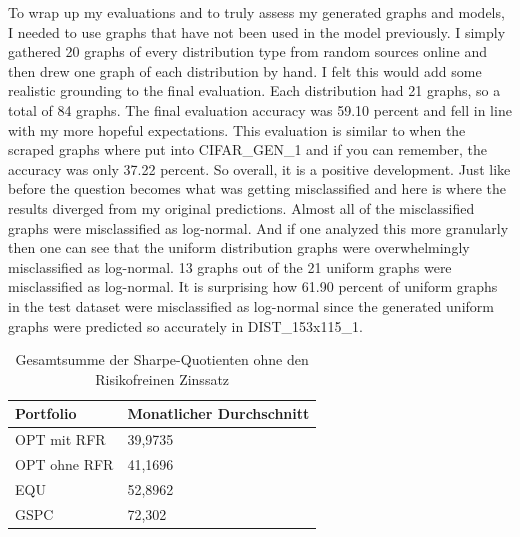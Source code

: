 \documentclass[12pt]{article}
\begin{document}
            To wrap up my evaluations and to truly assess my generated graphs and models, 
            I needed to use graphs that have not been used in the model previously. 
            I simply gathered 20 graphs of every distribution type from random sources online 
            and then drew one graph of each distribution by hand. I felt this would add some realistic grounding to the final evaluation. 
            Each distribution had 21 graphs, so a total of 84 graphs. 
            The final evaluation accuracy was 59.10 percent and fell in line with my more hopeful expectations. 
            This evaluation is similar to when the scraped graphs where put into CIFAR\_GEN\_1 and if you can remember, 
            the accuracy was only 37.22 percent. So overall, it is a positive development. 
            Just like before the question becomes what was getting misclassified 
            and here is where the results diverged from my original predictions. 
            Almost all of the misclassified graphs were misclassified as log-normal. 
            And if one analyzed this more granularly then one can see 
            that the uniform distribution graphs were overwhelmingly misclassified as log-normal. 
            13 graphs out of the 21 uniform graphs were misclassified as log-normal. 
            It is surprising how 61.90 percent of uniform graphs in the test dataset were misclassified as log-normal 
            since the generated uniform graphs were predicted so accurately in DIST\_153x115\_1.
            
  
                
        \begin{table}[htp]
            \begin{center}
                
                \begin{tabular}{ | l | l | }

                    \hline
                    \textbf{Portfolio}   & \textbf{Monatlicher Durchschnitt} \\
                    \hline
                    OPT mit RFR          & 39,9735  \\          
                    OPT ohne RFR         & 41,1696 \\
                    EQU                  & 52,8962  \\              
                    GSPC                 & 72,302  \\       
                            
                    \hline

                \end{tabular}
                \caption{Gesamtsumme der Sharpe-Quotienten ohne den Risikofreinen Zinssatz}
                \label{gs-sq-ohne-rfz}

            \end{center}
        \end{table}
\end{document}

